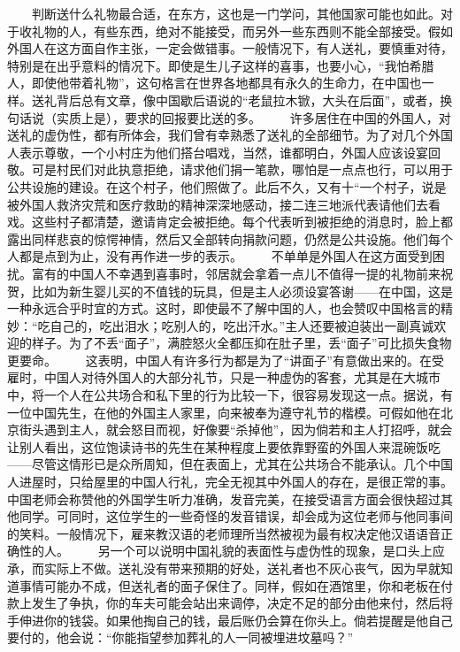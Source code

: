 \documentclass[12pt,oneside]{book}
\begin{document}
\begin{common-format}
　　判断送什么礼物最合适，在东方，这也是一门学问，其他国家可能也如此。对于收礼物的人，有些东西，绝对不能接受，而另外一些东西则不能全部接受。假如外国人在这方面自作主张，一定会做错事。一般情况下，有人送礼，要慎重对待，特别是在出乎意料的情况下。即使是生儿子这样的喜事，也要小心，“我怕希腊人，即使他带着礼物”，这句格言在世界各地都具有永久的生命力，在中国也一样。送礼背后总有文章，像中国歇后语说的“老鼠拉木锨，大头在后面”，或者，换句话说（实质上是），要求的回报要比送的多。 
　　许多居住在中国的外国人，对送礼的虚伪性，都有所体会，我们曾有幸熟悉了送礼的全部细节。为了对几个外国人表示尊敬，一个小村庄为他们搭台唱戏，当然，谁都明白，外国人应该设宴回敬。可是村民们对此执意拒绝，请求他们捐一笔款，哪怕是一点点也行，可以用于公共设施的建设。在这个村子，他们照做了。此后不久，又有十“一个村子，说是被外国人救济灾荒和医疗救助的精神深深地感动，接二连三地派代表请他们去看戏。这些村子都清楚，邀请肯定会被拒绝。每个代表听到被拒绝的消息时，脸上都露出同样悲哀的惊愕神情，然后又全部转向捐款问题，仍然是公共设施。他们每个人都是点到为止，没有再作进一步的表示。 
　　不单单是外国人在这方面受到困扰。富有的中国人不幸遇到喜事时，邻居就会拿着一点儿不值得一提的礼物前来祝贺，比如为新生婴儿买的不值钱的玩具，但是主人必须设宴答谢——在中国，这是一种永远合乎时宜的方式。这时，即使最不了解中国的人，也会赞叹中国格言的精妙：“吃自己的，吃出泪水；吃别人的，吃出汗水。”主人还要被迫装出一副真诚欢迎的样子。为了不丢“面子”，满腔怒火全都压抑在肚子里，丢“面子”可比损失食物更要命。 
　　这表明，中国人有许多行为都是为了“讲面子”有意做出来的。在受雇时，中国人对待外国人的大部分礼节，只是一种虚伪的客套，尤其是在大城市中，将一个人在公共场合和私下里的行为比较一下，很容易发现这一点。据说，有一位中国先生，在他的外国主人家里，向来被奉为遵守礼节的楷模。可假如他在北京街头遇到主人，就会怒目而视，好像要“杀掉他”，因为倘若和主人打招呼，就会让别人看出，这位饱读诗书的先生在某种程度上要依靠野蛮的外国人来混碗饭吃——尽管这情形已是众所周知，但在表面上，尤其在公共场合不能承认。几个中国人进屋时，只给屋里的中国人行礼，完全无视其中外国人的存在，是很正常的事。中国老师会称赞他的外国学生听力准确，发音完美，在接受语言方面会很快超过其他同学。可同时，这位学生的一些奇怪的发音错误，却会成为这位老师与他同事间的笑料。一般情况下，雇来教汉语的老师理所当然被视为最有权决定他汉语语音正确性的人。 
　　另一个可以说明中国礼貌的表面性与虚伪性的现象，是口头上应承，而实际上不做。送礼没有带来预期的好处，送礼者也不灰心丧气，因为早就知道事情可能办不成，但送礼者的面子保住了。同样，假如在酒馆里，你和老板在付款上发生了争执，你的车夫可能会站出来调停，决定不足的部分由他来付，然后将手伸进你的钱袋。如果他掏自己的钱，最后账仍会算在你头上。倘若提醒是他自己要付的，他会说：“你能指望参加葬礼的人一同被埋进坟墓吗？” 

\end{common-format}
\end{document}

